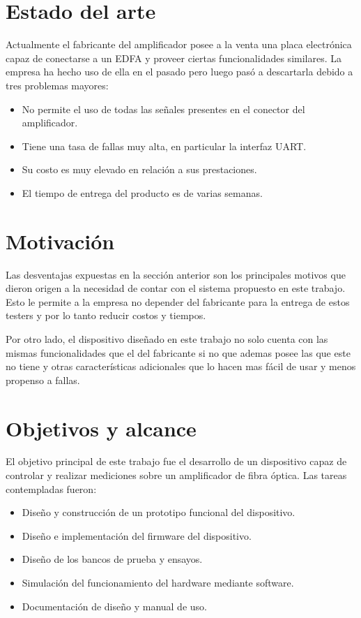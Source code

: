 \section{Estado del arte}

Actualmente el fabricante del amplificador posee a la venta una placa electrónica capaz de conectarse a un EDFA y proveer ciertas funcionalidades similares. La empresa ha hecho uso de ella en el pasado pero luego pasó a descartarla debido a tres problemas mayores:

\begin{itemize}
\item No permite el uso de todas las señales presentes en el conector del amplificador.
\item Tiene una tasa de fallas muy alta, en particular la interfaz UART.
\item Su costo es muy elevado en relación a sus prestaciones.
\item El tiempo de entrega del producto es de varias semanas.
\end{itemize}


\section{Motivación}

Las desventajas expuestas en la sección anterior son los principales motivos que dieron origen a la necesidad de contar con el sistema propuesto en este trabajo. Esto le permite a la empresa no depender del fabricante para la entrega de estos testers y por lo tanto reducir costos y tiempos.

Por otro lado, el dispositivo diseñado en este trabajo no solo cuenta con las mismas funcionalidades que el del fabricante si no que ademas posee las que este no tiene y otras características adicionales que lo hacen mas fácil de usar y menos propenso a fallas.


\section{Objetivos y alcance}

El objetivo principal de este trabajo fue el desarrollo de un dispositivo capaz de controlar y realizar mediciones sobre un amplificador de fibra óptica. Las tareas contempladas fueron:

\begin{itemize}
\item Diseño y construcción de un prototipo funcional del dispositivo.
\item Diseño e implementación del firmware del dispositivo.
\item Diseño de los bancos de prueba y ensayos.
\item Simulación del funcionamiento del hardware mediante software.
\item Documentación de diseño y manual de uso.
\end{itemize}


